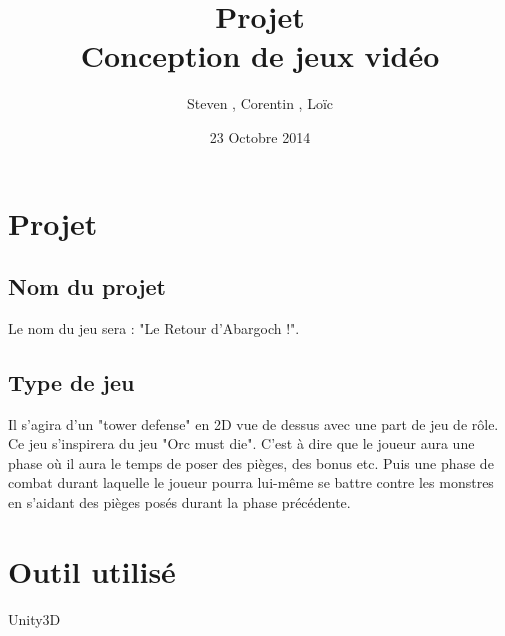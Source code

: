 \documentclass[12pt]{article}
\title{Projet \\ Conception de jeux vidéo}
\author{Steven \bsc{Gerard}, Corentin \bsc{Raoult}, Loïc \bsc{Tessier}}
\date {23 Octobre 2014}
\begin{document}
\maketitle{}

\section{Projet}
\subsection{Nom du projet}
Le nom du jeu sera : "Le Retour d'Abargoch !".
\subsection{Type de jeu}
Il s'agira d'un "tower defense" en 2D vue de dessus avec une part de jeu de rôle. Ce jeu s'inspirera du jeu "Orc must die". C'est à dire que le joueur aura une phase où il aura le temps de poser des pièges, des bonus etc. Puis une phase de combat durant laquelle le joueur pourra lui-même se battre contre les monstres en s'aidant des pièges posés durant la phase précédente.

\section{Outil utilisé}
Unity3D
\end{document}
